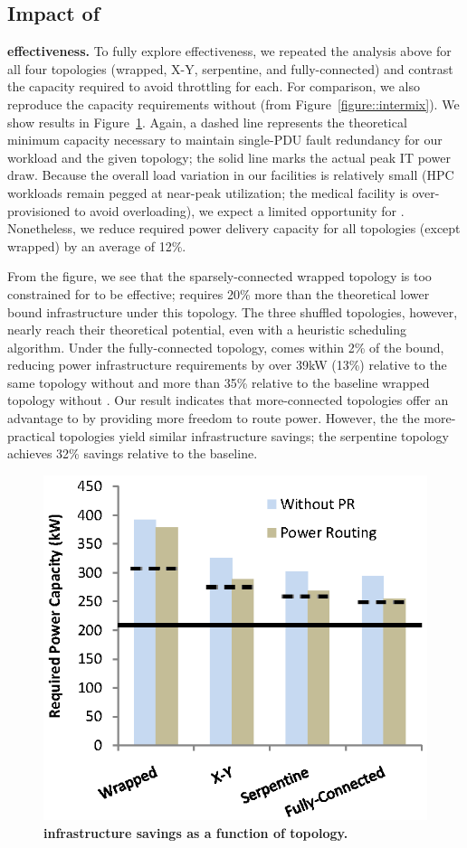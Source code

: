 \subsection{Impact of \PowerRouting}
\label{sec::routing}

{\bf \PowerRouting effectiveness.}
To fully explore \PowerRouting effectiveness, we repeated the analysis above for all four topologies (wrapped, X-Y, serpentine, and fully-connected) and contrast the capacity required to avoid throttling for each. For comparison, we also reproduce the capacity requirements without \PowerRouting (from Figure~\ref{figure::intermix}).  We show results in Figure~\ref{figure::powerrouting}.
Again, a dashed line represents the theoretical minimum capacity necessary to maintain single-PDU fault redundancy for our workload and the given topology; the solid line marks the actual peak IT power draw. Because the overall load variation in our facilities is relatively small (HPC workloads remain pegged at near-peak utilization; the medical facility is over-provisioned to avoid overloading), we expect a limited opportunity for \PowerRouting.  Nonetheless, we reduce required power delivery capacity for all topologies (except wrapped) by an average of 12\%.

From the figure, we see that the sparsely-connected wrapped topology is too constrained for \PowerRouting to be effective; \PowerRouting requires 20\% more than the theoretical lower bound infrastructure under this topology. The three shuffled topologies, however, nearly reach their theoretical potential, even with a heuristic scheduling algorithm.
Under the fully-connected topology, \PowerRouting comes within 2\% of the bound, reducing power infrastructure requirements by over 39kW (13\%) relative to the same topology without \PowerRouting and more than 35\% relative to the baseline wrapped topology without \PowerRouting.
Our result indicates that more-connected topologies offer an advantage to \PowerRouting by providing more freedom to route power.
However, the the more-practical topologies yield similar infrastructure savings; the serpentine topology achieves 32\% savings relative to the baseline.

\begin{figure}[t!]
\centering
\includegraphics[width = 3.0 in]{Appendices/PowerRouting/figure/result_powerrouting.eps}
\caption{ \textbf{\PowerRouting infrastructure savings as a function of topology.} }
\label{figure::powerrouting}
\vspace{-.1 in}
\end{figure}

